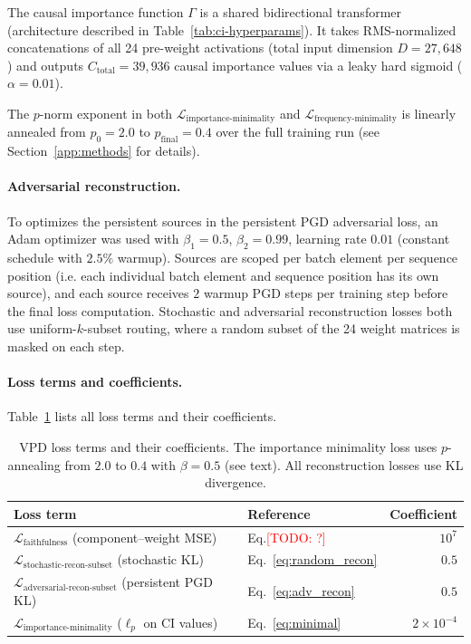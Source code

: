 \documentclass{article}
\newcommand{\todo}[1]{\textcolor{red}{[TODO: #1]}}
\begin{document}
The causal importance function $\Gamma$ is a shared bidirectional transformer (architecture described in Table~\ref{tab:ci-hyperparams}).
It takes RMS-normalized concatenations of all 24 pre-weight activations (total input dimension $D = 27{,}648$) and outputs $C_{\mathrm{total}} = 39{,}936$ causal importance values via a leaky hard sigmoid ($\alpha = 0.01$).

The $p$-norm exponent in both $\mathcal{L}_{\mathrm{importance\text{-}minimality}}$ and $\mathcal{L}_{\mathrm{frequency\text{-}minimality}}$ is linearly annealed from $p_0 = 2.0$ to $p_{\mathrm{final}} = 0.4$ over the full training run (see Section~\ref{app:methods} for details).

\paragraph{Adversarial reconstruction.}
To optimizes the persistent sources in the persistent PGD adversarial loss, an Adam optimizer was used with $\beta_1 = 0.5$, $\beta_2 = 0.99$, learning rate $0.01$ (constant schedule with $2.5\%$ warmup).
Sources are scoped per batch element per sequence position (i.e. each individual batch element and sequence position has its own source), and each source receives $2$ warmup PGD steps per training step before the final loss computation.
Stochastic and adversarial reconstruction losses both use uniform-$k$-subset routing, where a random subset of the 24 weight matrices is masked on each step.

\paragraph{Loss terms and coefficients.}
Table~\ref{tab:vpd-loss-coefficients} lists all loss terms and their coefficients.

\begin{table}[h]
\centering
\begin{tabular}{llr}
\toprule
\textbf{Loss term} & \textbf{Reference} & \textbf{Coefficient} \\
\midrule
$\mathcal{L}_{\mathrm{faithfulness}}$ (component--weight MSE) & Eq.\todo{?} & $10^{7}$ \\
$\mathcal{L}_{\mathrm{stochastic\text{-}recon\text{-}subset}}$ (stochastic KL) & Eq.~\ref{eq:random_recon} & $0.5$ \\
$\mathcal{L}_{\mathrm{adversarial\text{-}recon\text{-}subset}}$ (persistent PGD KL) & Eq.~\ref{eq:adv_recon} & $0.5$ \\
$\mathcal{L}_{\mathrm{importance\text{-}minimality}}$ ($\ell_p$ on CI values) & Eq.~\ref{eq:minimal} & $2 \times 10^{-4}$ \\
\bottomrule
\end{tabular}
\caption{VPD loss terms and their coefficients. The importance minimality loss uses $p$-annealing from $2.0$ to $0.4$ with $\beta = 0.5$ (see text). All reconstruction losses use KL divergence.}
\label{tab:vpd-loss-coefficients}
\end{table}
\end{document}
